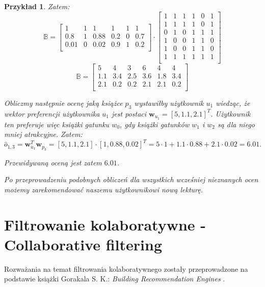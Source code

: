 \documentclass[12pt,a4paper]{report}
\newtheorem{przyklad}{Przykład}[chapter]{\normalfont}
\begin{document}
\begin{przyklad}
Zatem:
$$
\mathbb{B} = \left[
        \begin{array}{cccccc}
         1 & 1 & 1 & 1 & 1 & 1 \\
         0.8 & 1 & 0.88 & 0.2 & 0 & 0.7 \\
         0.01 & 0 & 0.02 & 0.9 & 1 & 0.2 \\
         \end{array}
      \right] \cdot \left[
        \begin{array}{cccccc}
         1 & 1 & 1 & 1 & 0 & 1 \\
         1 & 1 & 1 & 1 & 0 & 1 \\
         0 & 1 & 0 & 1 & 1 & 1 \\
         1 & 0 & 0 & 1 & 1 & 0 \\
         1 & 0 & 0 & 1 & 1 & 0 \\
         1 & 1 & 1 & 1 & 1 & 1 \\
         \end{array}
      \right] $$
      $$ \mathbb{B} = \left[
        \begin{array}{cccccc}
         5 & 4 & 3 & 6 & 4 & 4 \\
         1.1 & 3.4 & 2.5 & 3.6 & 1.8 & 3.4 \\
         2.1 & 0.2 & 0.2 & 2.1 & 2.1 & 0.2 \\
         \end{array}
      \right]$$

\bigskip
Obliczmy następnie ocenę jaką książce $p_3$ wystawiłby użytkownik $u_1$ wiedząc, że wektor preferencji użytkownika $u_1$ jest postaci $\mathbf{w}_{u_1}= [5,1.1,2.1]^T$. Użytkownik ten preferuje więc książki gatunku $w_0$, gdy książki gatunków $w_1$ i $w_2$ są dla niego mniej atrakcyjne.
Zatem:
$$
\widehat{o}_{1,3} = \mathbf{w}_{u_1}^T \mathbf{w}_{p_3} = [5,1.1,2.1] \cdot [1, 0.88, 0.02] ^ T = 5 \cdot 1 + 1.1 \cdot 0.88 + 2.1 \cdot 0.02 = 6.01.
$$

Przewidywaną oceną jest zatem $6.01$. 

Po przeprowadzeniu podobnych obliczeń dla wszystkich wcześniej nieznanych ocen możemy zarekomendować naszemu użytkownikowi nową lekturę.
\end{przyklad}


\section{Filtrowanie kolaboratywne - Collaborative filtering}
Rozważania na temat filtrowania kolaboratywnego zostały przeprowadzone na podstawie książki Gorakala S. K.: \textit{Building Recommendation Engines} {\citep[Sec 3]{bre}}.
\bigskip
\end{document}
